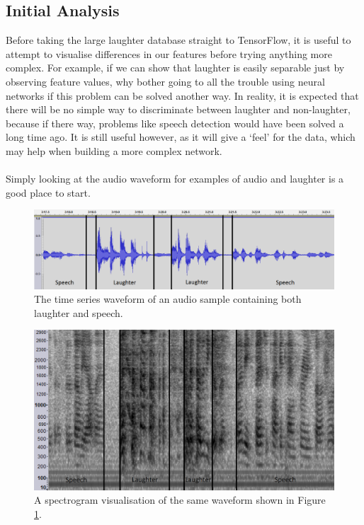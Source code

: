 \documentclass[a4paper,11pt,notitlepage]{article}
\begin{document}
\subsection{Initial Analysis}

Before taking the large laughter database straight to TensorFlow, it is useful to attempt to visualise differences in our features before trying anything more complex. For example, if we can show that laughter is easily separable just by observing feature values, why bother going to all the trouble using neural networks if this problem can be solved another way. In reality, it is expected that there will be no simple way to discriminate between laughter and non-laughter, because if there way, problems like speech detection would have been solved a long time ago. It is still useful however, as it will give a `feel' for the data, which may help when building a more complex network.\\
\\
Simply looking at the audio waveform for examples of audio and laughter is a good place to start.

\begin{figure}[H]
	\centering
	\vspace{0.5cm}
	\includegraphics[scale = 0.4]{figs/time-series2.png}
	\caption{The time series waveform of an audio sample containing both laughter and speech.}
	\label{time-series2}
\end{figure}

\begin{figure}[H]
	\centering
	\vspace{0.5cm}
	\includegraphics[scale = 0.462]{figs/spectrum2.png}
	\caption{A spectrogram visualisation of the same waveform shown in Figure \ref{time-series2}.}
	\label{spectrum2}
\end{figure}
\end{document}
